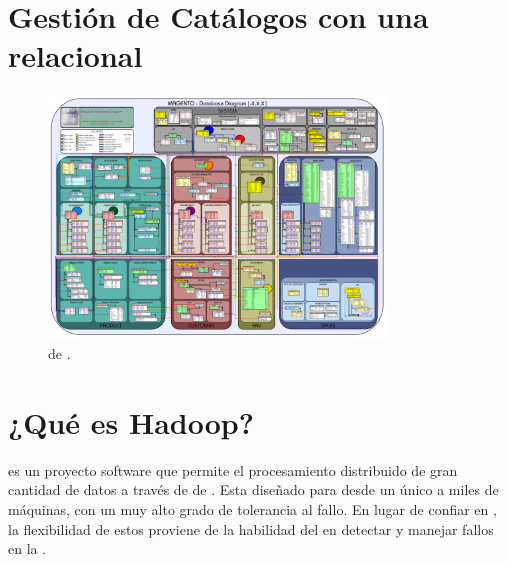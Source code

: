 
\appendix
\newpage

\chapter{Gestión de Catálogos \handledAS con una \dataBaseDB relacional}\label{ap:apendice_ecommerce_catalog_relational}

\begin{figure}[h!]
	\centering
	\includegraphics[width=0.8\textwidth]{figuras/apendice/magento_sample_database_diagram.png}
	\caption{\schemasDB de \nameMagento \ecommerce \frameworkPC.}
	\label{ap:figure:catalog_magento}
\end{figure}


\chapter{¿Qué es Hadoop? \cite{online_hadoop_description}}\label{ap:apendice_hadoop_description}
\apacheNAME \hadoopNAME es un proyecto software \openSourcePC que permite el procesamiento distribuido de gran cantidad de datos a través de \clustersAS de \serversAS. Esta diseñado para \scaleUpQA desde un único \serverAS a miles de máquinas, con un muy alto grado de tolerancia al fallo. En lugar de confiar en \highEndCPT \hardwarePC, la flexibilidad de estos \clustersAS proviene de la habilidad del \softwarePC en detectar y manejar fallos en la \applayer.

